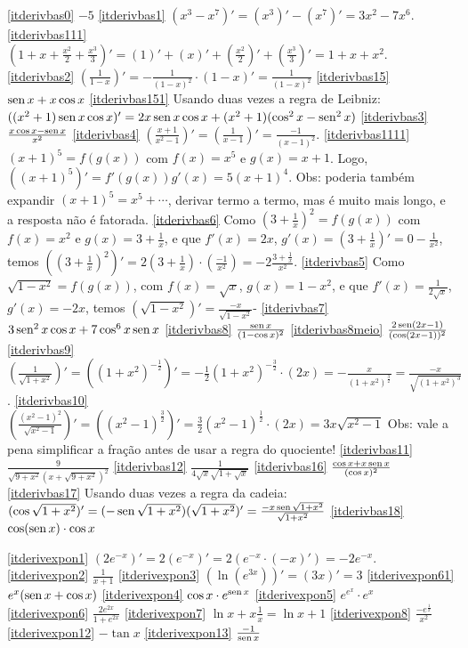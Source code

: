 \begin{Solution}{6.18}
\eqref{itderivbas0} $-5$
\eqref{itderivbas1} $(x^3-x^7)'=(x^3)'-(x^7)'=3x^2-7x^6$.
\eqref{itderivbas111}
$(1+x+\frac{x^2}{2}+\frac{x^3}{3})'=(1)'+(x)'+(\frac{x^2}{2})'+(\frac{x^3}{3})'
=1+x+x^2$.
\eqref{itderivbas2}
$(\frac{1}{1-x})'=-\frac{1}{(1-x)^2}\cdot(1-x)'=\frac{1}{(1-x)^2}$
\eqref{itderivbas15} $\operatorname{sen} x+x\cos x$
\eqref{itderivbas151} Usando duas vezes a regra de Leibniz:
$((x^2+1)\operatorname{sen} x\cos x)'=2x\operatorname{sen} x\cos x+(x^2+1)(\cos^2x-\operatorname{sen}^2x)$
\eqref{itderivbas3} $\frac{x\cos x-\operatorname{sen} x}{x^2}$
\eqref{itderivbas4} $(\frac{x+1}{x^2-1})'=(\frac{1}{x-1})'=\frac{-1}{(x-1)^2}$.
\eqref{itderivbas1111} $(x+1)^5=f(g(x))$ com $f(x)=x^5$ e $g(x)=x+1$.
Logo, $((x+1)^5)'=f'(g(x))g'(x)=5(x+1)^4$. Obs: poderia também expandir
$(x+1)^5=x^5+\cdots$, derivar termo a termo, mas é muito mais longo, e a
resposta não é fatorada.
\eqref{itderivbas6} Como $(3+\frac{1}{x})^2=f(g(x))$ com
$f(x)=x^2$ e $g(x)=3+\frac{1}{x}$, e que $f'(x)=2x$,
$g'(x)=(3+\frac{1}{x})'=0-\frac{1}{x^2}$, temos
$((3+\frac{1}{x})^2)'=2(3+\frac{1}{x})\cdot(\frac{-1}{x^2})=-2\frac{3+\frac{1}
{x}}{x^2}$.
\eqref{itderivbas5} Como $\sqrt{1-x^2}=f(g(x))$, com $f(x)=\sqrt{x}$,
$g(x)=1-x^2$, e que $f'(x)=\frac{1}{2\sqrt{x}}$, $g'(x)=-2x$,
temos $(\sqrt{1-x^2})'=\frac{-x}{\sqrt{1-x^2}}$-
\eqref{itderivbas7} $3\operatorname{sen}^2x\cos x+7\cos^6x\operatorname{sen} x$
\eqref{itderivbas8} $\frac{\operatorname{sen} x}{(1-\cos x)^2}$
\eqref{itderivbas8meio} $\frac{2\operatorname{sen} (2x-1)}{(\cos(2x-1))^2}$
\eqref{itderivbas9}
$(\frac{1}{\sqrt{1+x^2}})'=((1+x^2)^{-\frac12})'=-\frac12(1+x^2)^{-\frac32}
\cdot (2x)=-\frac{x}{(1+x^2)^{\frac32}}=\frac{-x}{\sqrt{(1+x^2)^3}}$.
\eqref{itderivbas10}
$(\frac{(x^2-1)^2}{\sqrt{x^2-1}})'=((x^2-1)^{\frac32})'=\frac{3}{2}(x^2-1)^{
\frac12}
\cdot(2x)=3x\sqrt{x^2-1}$ Obs: vale a pena simplificar a fração antes de
usar a regra do quociente!
\eqref{itderivbas11} $\frac{9}{\sqrt{9+x^2}(x+\sqrt{9+x^2})^2}$
\eqref{itderivbas12} $\frac{1}{4\sqrt{x}\sqrt{1+\sqrt{x}}}$
\eqref{itderivbas16} $\frac{\cos x+x\operatorname{sen} x}{(\cos x)^2}$
\eqref{itderivbas17} Usando duas vezes a regra da cadeia:
$(\cos\sqrt{1+x^2})'=(-\operatorname{sen} \sqrt{1+x^2})(\sqrt{1+x^2})'=\frac{-x\operatorname{sen}
\sqrt{1+x^2}}{\sqrt{1+x^2}}$
\eqref{itderivbas18} $\cos(\operatorname{sen} x)\cdot\cos x$
\end{Solution}
\begin{Solution}{6.19}
\eqref{itderivexpon1} $(2e^{-x})'=2(e^{-x})'=2(e^{-x}\cdot(-x)')=-2e^{-x}$.
\eqref{itderivexpon2} $\frac{1}{x+1}$
\eqref{itderivexpon3} $(\ln (e^{3x}))'=(3x)'=3$
\eqref{itderivexpon61} $e^x(\operatorname{sen} x+\cos x)$
\eqref{itderivexpon4} $\cos x \cdot e^{\operatorname{sen} x}$
\eqref{itderivexpon5} $e^{e^x}\cdot e^x$
\eqref{itderivexpon6} $\frac{2e^{2x}}{1+e^{2x}}$
\eqref{itderivexpon7} $\ln x+x\frac{1}{x}=\ln x+1$
\eqref{itderivexpon8} $\frac{-e^{\frac1x}}{x^2}$
\eqref{itderivexpon12} $-\tan x$
\eqref{itderivexpon13} $\frac{-1}{\operatorname{sen} x}$
\end{Solution}
